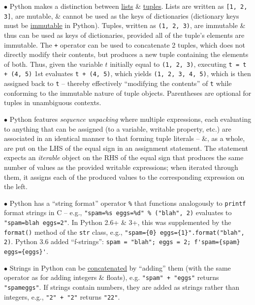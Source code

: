 \documentclass{article}
\numberwithin{equation}{section}
\begin{document}
\begin{enumerate*}
	\item[$\bullet$] Python makes a distinction between \href{https://en.wikipedia.org/wiki/List_(computer_science)}{lists} \& \href{https://en.wikipedia.org/wiki/Tuple}{tuples}. Lists are written as \texttt{[1, 2, 3]}, are mutable, \& cannot be used as the keys of dictionaries (dictionary keys must be \href{https://en.wikipedia.org/wiki/Immutable}{immutable} in Python). Tuples, written as \texttt{(1, 2, 3)}, are immutable \& thus can be used as keys of dictionaries, provided all of the tuple's elements are immutable. The \texttt{+} operator can be used to concatenate 2 tuples, which does not directly modify their contents, but produces a new tuple containing the elements of both. Thus, given the variable $t$ initially equal to \texttt{(1, 2, 3)}, executing \texttt{t = t + (4, 5)} 1st evaluates \texttt{t + (4, 5)}, which yields \texttt{(1, 2, 3, 4, 5)}, which is then assigned back to \texttt{t} -- thereby effectively ``modifying the contents'' of \texttt{t} while conforming to the immutable nature of tuple objects. Parentheses are optional for tuples in unambiguous contexts.
	\item[$\bullet$] Python features \textit{sequence unpacking} where multiple expressions, each evaluating to anything that can be assigned (to a variable, writable property, etc.) are associated in an identical manner to that forming tuple literals -- \&, as a whole, are put on the LHS of the equal sign in an assignment statement. The statement expects an \textit{iterable} object on the RHS of the equal sign that produces the same number of values as the provided writable expressions; when iterated through them, it assigns each of the produced values to the corresponding expression on the left.
	\item[$\bullet$] Python has a ``string format'' operator \verb|%| that functions analogously to \texttt{printf} format strings in C -- e.g., \verb|"spam=%s eggs=%d" % ("blah", 2)| evaluates to \verb|"spam=blah eggs=2"|. In Python 2.6+ \& 3+, this was supplemented by the \texttt{format()} method of the \texttt{str} class, e.g., \verb|"spam={0} eggs={1}".format("blah", 2)|. Python 3.6 added ``f-strings'': \verb|spam = "blah"; eggs = 2; f'spam={spam} eggs={eggs}'|.
	\item[$\bullet$] Strings in Python can be \href{https://en.wikipedia.org/wiki/Concatenation}{concatenated} by ``adding'' them (with the same operator as for adding integers \& floats), e.g. \verb|"spam" + "eggs"| returns \verb|"spameggs"|. If strings contain numbers, they are added as strings rather than integers, e.g., \verb|"2" + "2"| returns \verb|"22"|.

\end{enumerate*}
\end{document}
